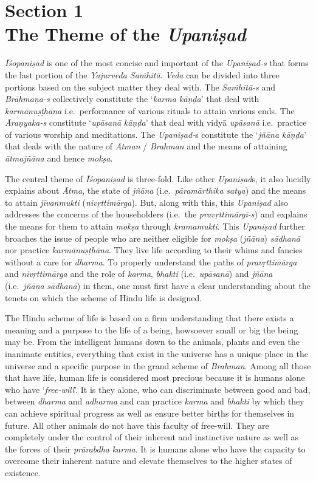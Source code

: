 \chapter[Section 1 The Theme of the \emph{Upaniṣad}]{Section 1\\ The Theme of the \emph{Upaniṣad}}

\emph{Īśopaniṣad} is one of the most concise and important of the \emph{Upaniṣad-s} that forms the last portion of the \emph{Yajurveda Saṁhitā}. \emph{Veda} can be divided into three portions based on the subject matter they deal with. The \emph{Saṁhitā-s} and \emph{Brāhmaṇa-s} collectively constitute the `\emph{karma kāṇḍa}' that deal with \emph{karmānuṣṭhāna} i.e.\ performance of various rituals to attain various ends. The \emph{Āraṇyaka-s} constitute `\emph{upāsanā} \emph{kāṇḍa}' that deal with vidyā \emph{upāsanā} i.e.\ practice of various worship and meditations. The \emph{Upaniṣad-}s constitute the `\emph{jñāna kāṇḍa}' that deals with the nature of \emph{Ātman} / \emph{Brahman} and the means of attaining \emph{ātmajñāna} and hence \emph{mokṣa}.
\vskip 2pt

The central theme of \emph{Īśopaniṣad} is three-fold. Like other \emph{Upaniṣad}s, it also lucidly explains about \emph{Ātma}, the state of \emph{jñāna} (i.e.\ \emph{pāramārthika} \emph{satya}) and the means to attain \emph{jīvanmukti} (\emph{nivṛttimārga}). But, along with this, this \emph{Upaniṣad} also addresses the concerns of the householders (i.e.\ the \emph{pravṛttimārgī-s}) and explains the means for them to attain \emph{mokṣa} through \emph{kramamukti}. This \emph{Upaniṣad} further broaches the issue of people who are neither eligible for \emph{mokṣa} (\emph{jñāna}) \emph{sādhanā} nor practice \emph{karmānuṣṭhāna}. They live life according to their whims and fancies without a care for \emph{dharma}. To properly understand the paths of \emph{pravṛttimārga} and \emph{nivṛttimārga} and the role of \emph{karma}, \emph{bhakti} (i.e.\ \emph{upāsanā}) and \emph{jñāna} (i.e.\ \emph{jñāna} \emph{sādhanā}) in them, one must first have a clear understanding about the tenets on which the scheme of Hindu life is designed.
\vskip 2.3pt

The Hindu scheme of life is based on a firm understanding that there exists a meaning and a purpose to the life of a being, howsoever small or big the being may be. From the intelligent humans down to the animals, plants and even the inanimate entities, everything that exist in the universe has a unique place in the universe and a specific purpose in the grand scheme of \emph{Brahman}. Among all those that have life, human life is considered most precious because it is humans alone who have `\emph{free-will}'. It is they alone, who can discriminate between good and bad, between \emph{dharma} and \emph{adharma} and can practice \emph{karma} and \emph{bhakti} by which they can achieve spiritual progress as well as ensure better births for themselves in future. All other animals do not have this faculty of free-will. They are completely under the control of their inherent and instinctive nature as well as the forces of their \emph{prārabdha} \emph{karma}. It is humans alone who have the capacity to overcome their inherent nature and elevate themselves to the higher states of existence.
\vskip 4pt

